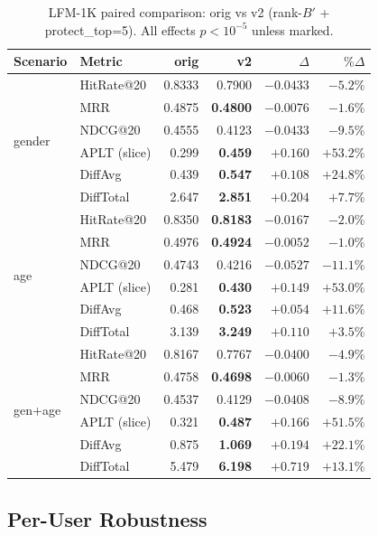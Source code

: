 \begin{table}[h]
\caption{LFM-1K paired comparison: orig vs v2 (rank-$B'$ + protect\_top=5). All effects $p < 10^{-5}$ unless marked.}
\label{tab:lfm1k-main}
\begin{tabular}{llrrrr}
\toprule
Scenario & Metric & orig & v2 & $\Delta$ & $\%\Delta$ \\
\midrule
\multirow{6}{*}{gender}
& HitRate@20 & 0.8333 & 0.7900 & $-0.0433$ & $-5.2\%$ \\
& MRR & 0.4875 & \textbf{0.4800} & $-0.0076$ & $\mathbf{-1.6\%}$ \\
& NDCG@20 & 0.4555 & 0.4123 & $-0.0433$ & $-9.5\%$ \\
& APLT (slice) & 0.299 & \textbf{0.459} & $+0.160$ & $\mathbf{+53.2\%}$ \\
& DiffAvg & 0.439 & \textbf{0.547} & $+0.108$ & $\mathbf{+24.8\%}$ \\
& DiffTotal & 2.647 & \textbf{2.851} & $+0.204$ & $\mathbf{+7.7\%}$ \\
\midrule
\multirow{6}{*}{age}
& HitRate@20 & 0.8350 & \textbf{0.8183} & $-0.0167$ & $\mathbf{-2.0\%}$ \\
& MRR & 0.4976 & \textbf{0.4924} & $-0.0052$ & $\mathbf{-1.0\%}$ \\
& NDCG@20 & 0.4743 & 0.4216 & $-0.0527$ & $-11.1\%$ \\
& APLT (slice) & 0.281 & \textbf{0.430} & $+0.149$ & $\mathbf{+53.0\%}$ \\
& DiffAvg & 0.468 & \textbf{0.523} & $+0.054$ & $\mathbf{+11.6\%}$ \\
& DiffTotal & 3.139 & \textbf{3.249} & $+0.110$ & $\mathbf{+3.5\%}$ \\
\midrule
\multirow{6}{*}{gen+age}
& HitRate@20 & 0.8167 & 0.7767 & $-0.0400$ & $-4.9\%$ \\
& MRR & 0.4758 & \textbf{0.4698} & $-0.0060$ & $\mathbf{-1.3\%}$ \\
& NDCG@20 & 0.4537 & 0.4129 & $-0.0408$ & $-8.9\%$ \\
& APLT (slice) & 0.321 & \textbf{0.487} & $+0.166$ & $\mathbf{+51.5\%}$ \\
& DiffAvg & 0.875 & \textbf{1.069} & $+0.194$ & $\mathbf{+22.1\%}$ \\
& DiffTotal & 5.479 & \textbf{6.198} & $+0.719$ & $\mathbf{+13.1\%}$ \\
\bottomrule
\end{tabular}
\end{table}

\subsection{Per-User Robustness}

